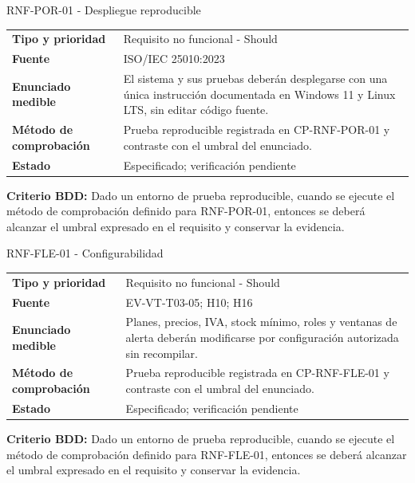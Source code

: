\documentclass[11pt,a4paper]{article}
\begin{document}
\begin{reqbox}[colframe=Teal]{RNF-POR-01 - Despliegue reproducible}
\begin{tabularx}{\textwidth}{>{\bfseries}p{3.2cm}Y}
Tipo y prioridad & Requisito no funcional - Should \\
Fuente & ISO/IEC 25010:2023 \\
Enunciado medible & El sistema y sus pruebas deberán desplegarse con una única instrucción documentada en Windows 11 y Linux LTS, sin editar código fuente. \\
Método de comprobación & Prueba reproducible registrada en CP-RNF-POR-01 y contraste con el umbral del enunciado. \\
Estado & Especificado; verificación pendiente \\
\end{tabularx}
\textbf{Criterio BDD:} Dado un entorno de prueba reproducible, cuando se ejecute el método de comprobación definido para RNF-POR-01, entonces se deberá alcanzar el umbral expresado en el requisito y conservar la evidencia.
\end{reqbox}


\begin{reqbox}[colframe=Teal]{RNF-FLE-01 - Configurabilidad}
\begin{tabularx}{\textwidth}{>{\bfseries}p{3.2cm}Y}
Tipo y prioridad & Requisito no funcional - Should \\
Fuente & EV-VT-T03-05; H10; H16 \\
Enunciado medible & Planes, precios, IVA, stock mínimo, roles y ventanas de alerta deberán modificarse por configuración autorizada sin recompilar. \\
Método de comprobación & Prueba reproducible registrada en CP-RNF-FLE-01 y contraste con el umbral del enunciado. \\
Estado & Especificado; verificación pendiente \\
\end{tabularx}
\textbf{Criterio BDD:} Dado un entorno de prueba reproducible, cuando se ejecute el método de comprobación definido para RNF-FLE-01, entonces se deberá alcanzar el umbral expresado en el requisito y conservar la evidencia.
\end{reqbox}
\end{document}
